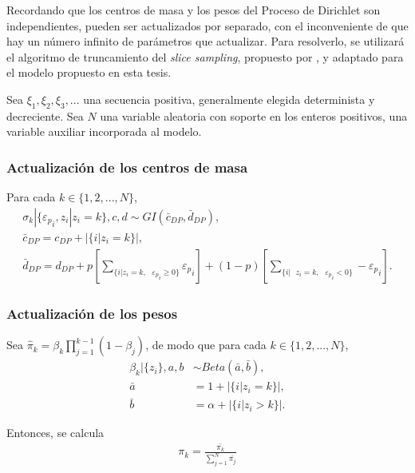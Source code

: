 Recordando que los centros de masa y los pesos del Proceso de Dirichlet son independientes, pueden ser actualizados por separado, con el inconveniente de que hay un n\'umero infinito de par\'ametros que actualizar. Para resolverlo, se utilizará el algoritmo de truncamiento del \textit{slice sampling}, propuesto por \cite{Kalli_Slice}, y adaptado para el modelo propuesto en esta tesis.

Sea $\xi_1,\xi_2,\xi_3,...$ una secuencia positiva, generalmente elegida determinista y decreciente. Sea $N$ una variable aleatoria con soporte en los enteros positivos, una variable auxiliar incorporada al modelo.

\subsubsection{Actualizaci\'on de los centros de masa}

Para cada $k \in \{1,2,...,N\}$,
\begin{equation*}
\begin{gathered}
    \sigma_k | \{{\varepsilon_p}_i, z_i | z_i = k\}, c, d \sim GI(\bar{c}_{DP}, \bar{d}_{DP}),\\
    \bar{c}_{DP} = c_{DP} + |\{i| z_i = k\}|, \\
    \bar{d}_{DP} = d_{DP} 
    + p \left[\sum_{\{i| z_i = k,\text{ }{\varepsilon_p}_i \geq 0\}} {\varepsilon_p}_i\right]
    + (1-p) \left[\sum_{\{i| \text{ } z_i = k,\text{ }{\varepsilon_p}_i < 0\}}  -{\varepsilon_p}_i\right].
\end{gathered}
\end{equation*}

\subsubsection{Actualizaci\'on de los pesos}

Sea $\hat{\pi}_k = \beta_k \prod_{j=1}^{k-1}(1 - \beta_j)$, de modo que para cada $k \in \{1,2,...,N\}$,
\begin{equation*}
\begin{aligned}
    \beta_k|\{z_i\}, a,b &\sim Beta(\bar{a}, \bar{b}), \\
    \bar{a} &= 1 + |\{i|z_i = k\}|, \\
    \bar{b} &= \alpha + |\{i|z_i > k\}|.
\end{aligned}
\end{equation*}

Entonces, se calcula
\begin{equation*}
\begin{aligned}
    \pi_k = \frac{\bar{\pi_k}}{\sum_{j=1}^N \bar{\pi_j}}
\end{aligned}
\end{equation*}

